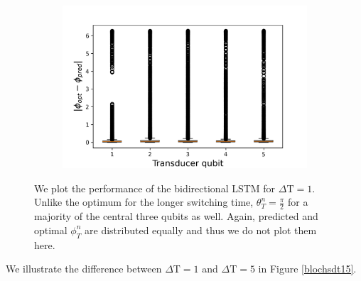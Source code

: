 \begin{figure}
\begin{subfigure}{0.35\textwidth}
	\end{subfigure}
	\begin{subfigure}{0.35\textwidth}
		\centering
		\includegraphics[width=\textwidth]{img/delta_phi_box_dt_12}
	\end{subfigure}
	\caption{We plot the performance of the bidirectional LSTM for $\Delta \mathrm{T} = 1$. Unlike the optimum for the longer switching time, $\theta_T^n = \frac{\pi}{2}$ for a majority of the central three qubits as well. Again, predicted and optimal $\phi^n_T$ are distributed equally and thus we do not plot them here.}
	\label{dt1box}
\end{figure}

We illustrate the difference between $\Delta \mathrm{T} = 1$ and $\Delta \mathrm{T} = 5$ in Figure \ref{blochsdt15}.

